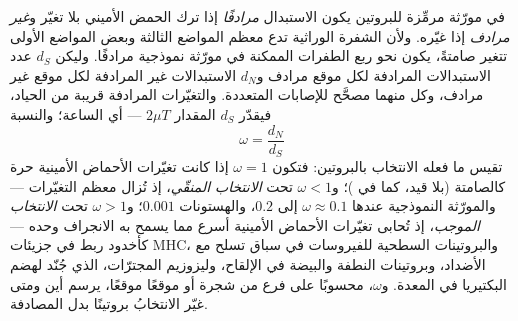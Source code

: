 \begin{definition}[نسبة dN/dS]\label{def:b3:molecular-evolution:dnds}
في مورّثة مرمِّزة للبروتين يكون الاستبدال \emph{مرادفًا} إذا
ترك الحمض الأميني بلا تغيّر و\emph{غير مرادف} إذا
غيّره. ولأن الشفرة الوراثية تدع معظم المواضع الثالثة وبعض
المواضع الأولى تتغير صامتةً، يكون نحو ربع الطفرات الممكنة في
مورّثة نموذجية مرادفًا. وليكن $d_{S}$ عدد
الاستبدالات المرادفة لكل موقع مرادف و$d_{N}$
الاستبدالات غير المرادفة لكل موقع غير مرادف، وكل منهما مصحَّح
للإصابات المتعددة. والتغيّرات المرادفة قريبة من الحياد،
فيقدّر $d_{S}$ المقدار $2\mu T$ --- أي الساعة؛ والنسبة
\[
\omega = \frac{d_{N}}{d_{S}}
\]
تقيس ما فعله الانتخاب بالبروتين: فتكون $\omega = 1$ إذا كانت
تغيّرات الأحماض الأمينية حرة كالصامتة (بلا قيد، كما في
)؛ و$\omega < 1$ تحت \emph{الانتخاب المنقّي}، إذ
تُزال معظم التغيّرات --- والمورّثة النموذجية عندها $\omega \approx 0.1$
إلى $0.2$، والهستونات $0.001$؛ و$\omega > 1$ تحت \emph{الانتخاب
الموجب}، إذ تُحابى تغيّرات الأحماض الأمينية أسرع مما يسمح به
الانجراف وحده --- كأخدود ربط  في جزيئات MHC،
والبروتينات السطحية للفيروسات في سباق تسلح مع الأضداد،
وبروتينات النطفة والبيضة في الإلقاح، وليزوزيم المجترّات،
الذي جُنّد لهضم البكتيريا في المعدة. و$\omega$، محسوبًا على
فرع من شجرة أو موقعًا موقعًا، يرسم أين ومتى غيّر الانتخابُ
بروتينًا بدل المصادفة.
\end{definition}

